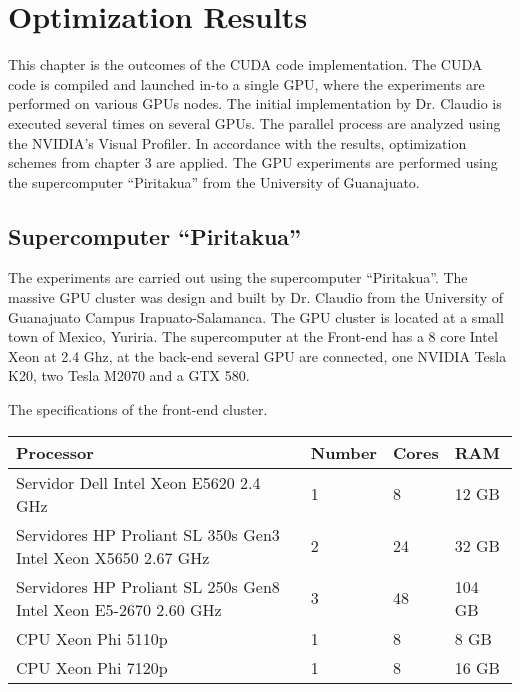 
\chapter{Optimization Results} %

\label{Optimization Results} %



This chapter is the outcomes of the CUDA code implementation. The CUDA code is compiled and launched in-to a single GPU, where the experiments are performed on various GPUs nodes. The initial implementation by Dr. Claudio is executed several times on several GPUs. The parallel process  are analyzed using the NVIDIA's Visual Profiler. In accordance with the results, optimization schemes from chapter 3 are applied. The GPU experiments are performed using the supercomputer ``Piritakua'' from the  University of Guanajuato.

\section{Supercomputer ``Piritakua''}

The experiments are  carried out using the supercomputer “Piritakua”. The massive GPU cluster was design and built by Dr. Claudio from the University of Guanajuato Campus Irapuato-Salamanca. The GPU cluster is located at a small town of Mexico, Yuriria. The supercomputer at the Front-end has a 8 core Intel Xeon at 2.4 Ghz, at the back-end several GPU are connected, one NVIDIA Tesla K20, two Tesla M2070 and a GTX 580.

The specifications of the front-end cluster.

\begin{tabular}{ | p{7.1cm}  | l | l | l |}      
  \hline   
  Processor & Number & Cores & RAM  \\
  \hline
  Servidor Dell Intel Xeon E5620 2.4 GHz & 1 & 8 & 12 GB \\
  \hline
  Servidores HP Proliant SL 350s Gen3 Intel Xeon X5650 2.67 GHz & 2 & 24 & 32 GB \\
  \hline
   Servidores HP Proliant SL 250s Gen8 Intel Xeon E5-2670 2.60 GHz & 3 & 48 &104 GB \\
   \hline
   CPU Xeon Phi  5110p & 1 & 8 & 8 GB\\
   \hline
   CPU Xeon Phi 7120p  & 1 & 8 & 16 GB\\
   \hline
  \end{tabular}
  

